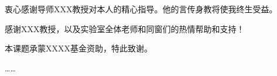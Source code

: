 
\begin{acknowledgements}

衷心感谢导师XXX教授对本人的精心指导。他的言传身教将使我终生受益。

感谢XXX教授，以及实验室全体老师和同窗们的热情帮助和支持！

本课题承蒙XXXX基金资助，特此致谢。

\ldots\ldots

\end{acknowledgements}
